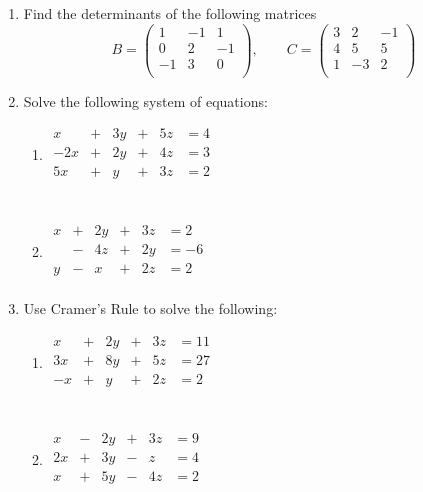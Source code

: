 \documentclass[11pt,a4paper]{article}
\theoremstyle{definition}
\begin{document}
\begin{enumerate}
\item Find the determinants of the following matrices
$$B=
\begin{pmatrix}
1 & -1 & 1\\
0 & 2 & -1\\ 
-1 & 3 & 0\\
\end{pmatrix}
,\qquad 
C=
\begin{pmatrix}
3 & 2 & -1\\
4 & 5 & 5\\
1 & -3 & 2\\
\end{pmatrix}
$$

\item Solve the following system of equations:
\begin{enumerate}
\item \quad 
$
\begin{matrix}
x & + & 3y & + & 5z & =4\\
-2x & + & 2y & + &4z & =3\\
5x & + & y & + & 3z & =2\\
\end{matrix}
$\\\\

\item \quad 
$
\begin{matrix}
x & + & 2y & + & 3z & =2\\
  & - & 4z & + & 2y  & = -6\\
y & - & x & + & 2z & = 2\\
\end{matrix}
$\\
\end{enumerate}


\item Use Cramer's Rule  to solve the following:
\begin{enumerate}
\item \quad 
$
\begin{matrix}
x & + & 2y & + & 3z & =11\\
3x & + & 8y & + & 5z & =27\\
-x & + & y & + & 2z & = 2\\
\end{matrix}
$\\\\

\item \quad 
$
\begin{matrix}
x & - & 2y & + & 3z & = 9\\
2x & + & 3y & - & z & =4\\
x & + & 5y & - & 4z & =2\\
\end{matrix}
$
\end{enumerate}




\end{enumerate}
\end{document}
